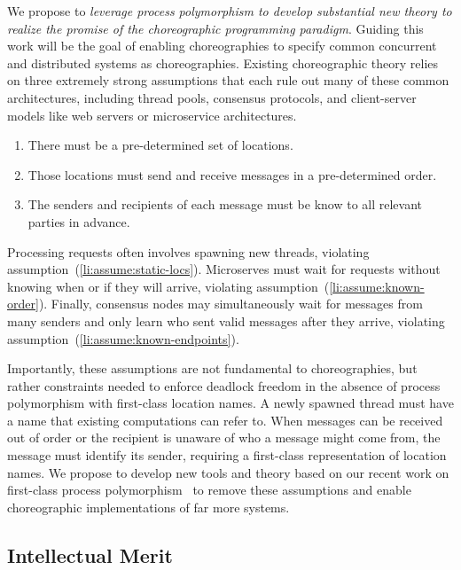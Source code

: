 We propose to \emph{leverage process polymorphism to develop substantial new theory to realize the promise of the choreographic programming paradigm}.
Guiding this work will be the goal of enabling choreographies to specify common concurrent and distributed systems as choreographies.
Existing choreographic theory relies on three extremely strong assumptions
that each rule out many of these common architectures, including thread pools, consensus protocols, and client-server models like web servers or microservice architectures.
\begin{enumerate}
  \item\label{li:assume:static-locs}
    There must be a pre-determined set of locations.
  \item\label{li:assume:known-order}
    Those locations must send and receive messages in a pre-determined order.
  \item\label{li:assume:known-endpoints}
    The senders and recipients of each message must be know to all relevant parties in advance.
\end{enumerate}
Processing requests often involves spawning new threads, violating assumption~(\ref{li:assume:static-locs}).
Microserves must wait for requests without knowing when or if they will arrive, violating assumption~(\ref{li:assume:known-order}).
Finally, consensus nodes may simultaneously wait for messages from many senders
and only learn who sent valid messages after they arrive,
violating assumption~(\ref{li:assume:known-endpoints}).

Importantly, these assumptions are not fundamental to choreographies,
but rather constraints needed to enforce deadlock freedom in the absence of process polymorphism with first-class location names.
A newly spawned thread must have a name that existing computations can refer to.
When messages can be received out of order or the recipient is unaware of who a message might come from,
the message must identify its sender, requiring a first-class representation of location names.
We propose to develop new tools and theory based on our recent work on first-class process polymorphism~\citep{SamuelsonHC25}
to remove these assumptions and enable choreographic implementations of far more systems.


\subsection{Intellectual Merit}

